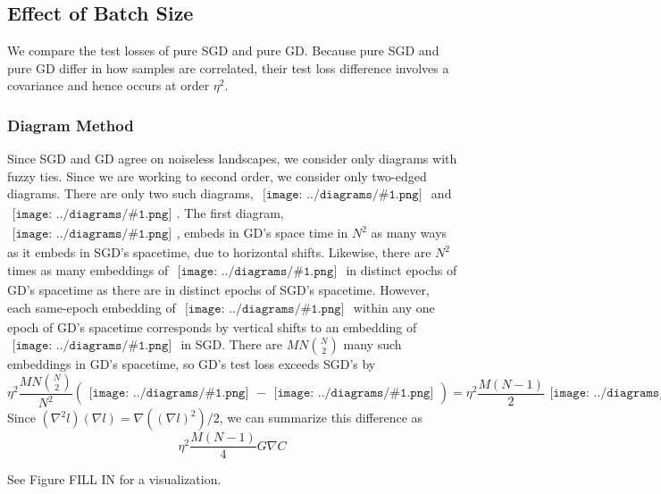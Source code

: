 \documentclass{article}
\newcommand{\sdia}[1]{\begin{gathered}\texttt{[image: ../diagrams/\#1.png]}\end{gathered}}
\begin{document}
    \subsection*{Effect of Batch Size}
        We compare the test losses of pure SGD and pure GD.  Because pure
        SGD and pure GD differ in how samples are correlated, their test loss
        difference involves a covariance and hence occurs at order $\eta^2$.  

        \subsubsection*{Diagram Method}
        Since SGD and GD agree on noiseless landscapes, we consider only
        diagrams with fuzzy ties.  Since we are working to second order, we
        consider only two-edged diagrams.  There are only two such diagrams,
        $\sdia{(01-2)(02-12)}$ and
        $\sdia{(01-2)(01-12)}$.
        The first diagram, $\sdia{(01-2)(02-12)}$, embeds in GD's space time in
        $N^2$ as many ways as it embeds in SGD's spacetime, due to horizontal
        shifts.
        Likewise, there are $N^2$ times as many embeddings of
        $\sdia{(01-2)(02-12)}$ in distinct epochs of GD's spacetime as there
        are in distinct epochs of SGD's spacetime.
        However, each same-epoch embedding of $\sdia{(01-2)(01-12)}$ within 
        any one epoch of GD's spacetime corresponds by vertical shifts to
        an embedding of $\sdia{(0-1-2)(01-12)}$ in SGD.  There are $MN{N\choose 2}$ 
        many such embeddings in GD's spacetime, so GD's test loss exceeds SGD's
        by 
        $$
            \eta^2 \frac{MN{N\choose 2}}{N^2} (\sdia{(01-2)(01-12)} - \sdia{(0-1-2)(01-12)}) 
            =
            \eta^2 \frac{M(N-1)}{2} \sdia{c(01-2)(01-12)}
        $$
        Since $(\nabla^2 l) (\nabla l) = \nabla((\nabla l)^2)/2$, we can 
        summarize this difference as
        $$
            \eta^2 \frac{M(N-1)}{4}
            G \nabla C 
        $$

        See Figure FILL IN for a visualization.
\end{document}
